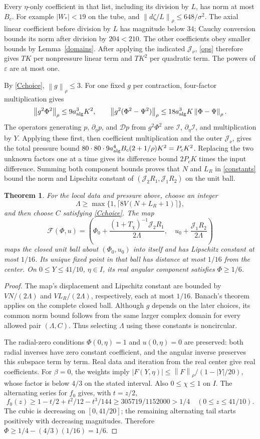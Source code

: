 \documentclass[11pt]{article}
\newtheorem{theorem}{Theorem}
\newcommand{\norm}[1]{\left\lVert#1\right\rVert_\rho}
\newcommand{\DY}{\mathcal D}
\newcommand{\J}{\mathcal J}
\newcommand{\Int}{\mathcal I}
\begin{document}
Every $\eta$-only coefficient in that list, including its division by $L$,
has norm at most $B_c$. For example $|W_*|<19$ on the tube, and
$\norm{d\zeta/L}\le648/\sigma^2$. The axial linear coefficient before
division by $L$ has magnitude below $34$; Cauchy conversion bounds its
norm after division by $204<210$. The other coefficients obey smaller
bounds by Lemma~\ref{domains}. After applying the indicated $\J_\nu$,
\eqref{ops} therefore gives $TK$ per nonpressure linear term and $TK^2$
per quadratic term. The powers of $\varepsilon$ are at most one.

By \eqref{Cchoice}, $\norm{g}\le3$. For one fixed $g$ per contraction,
four-factor multiplication gives
\[
\norm{g^2\Phi^2}\le9a_{\rm alg}^3K^2,\qquad
\norm{g^2(\Phi^2-\Psi^2)}\le18a_{\rm alg}^3K\norm{\Phi-\Psi}.
\]
The operators generating $p$, $\partial_\eta p$, and $\DY p$ from
$g^2\Phi^2$ are $\Int$, $\partial_\eta\Int$, and multiplication by $Y$.
Applying these first, then coefficient multiplication and the outer
$\J_\nu$, gives the total pressure bound
$80\cdot80\cdot9a_{\rm alg}^4B_c(2+1/\rho)K^2=P_cK^2$.
Replacing the two unknown factors one at a time gives its difference
bound $2P_cK$ times the input difference.
Summing both component bounds proves that $N$ and $L_R$ in
\eqref{constants} bound the norm and Lipschitz constant of
$(\J_2R_1,\J_1R_2)$ on the unit ball.

\begin{theorem}\label{contraction}
For the local data and pressure above, choose an integer
\[
\Lambda\ge\max\{1,\lceil8V(N+L_R+1)\rceil\},
\]
and then choose $C$ satisfying \eqref{Cchoice}.
The map
\[
\mathcal F(\Phi,u)=\left(
\Phi_0+\frac{(1+T_\chi)^{-1}\J_2R_1}{2\Lambda},\quad
u_0+\frac{\J_1R_2}{2\Lambda}\right)
\]
maps the closed unit ball about $(\Phi_0,u_0)$ into itself and has
Lipschitz constant at most $1/16$. Its unique fixed point in that ball
has distance at most $1/16$ from the center. On $0\le Y\le41/10$,
$\eta\in I$, its real angular component satisfies $\Phi\ge1/6$.
\end{theorem}
\begin{proof}
The map's displacement and Lipschitz constant are bounded by
$VN/(2\Lambda)$ and $VL_R/(2\Lambda)$, respectively, each at most
$1/16$. Banach's theorem applies on the complete closed ball.
Although $g$ depends on the later choices, its common norm bound follows
from the same larger complex domain for every allowed pair $(\Lambda,C)$.
Thus selecting $\Lambda$ using these constants is noncircular.

The radial-zero conditions $\Phi(0,\eta)=1$ and $u(0,\eta)=0$ are preserved:
both radial inverses have zero constant coefficient, and the angular
inverse preserves this subspace term by term. Real data and iteration from
the real center give real coefficients.
For $\beta=0$, the weights imply
$|F(Y,\eta)|\le\norm{F}/(1-|Y|/20)$, whose factor is below $4/3$
on the stated interval. Also $0\le\chi\le1$ on $I$.
The alternating series for $f_0$ gives, with $t=z/2$,
\[
f_0(z)\ge1-t/2+t^2/12-t^3/144\ge305719/1152000>1/4
\quad(0\le z\le41/10).
\]
The cubic is decreasing on $[0,41/20]$; the remaining alternating
tail starts positively with decreasing magnitudes. Therefore
$\Phi\ge1/4-(4/3)(1/16)=1/6$.
\end{proof}
\end{document}
